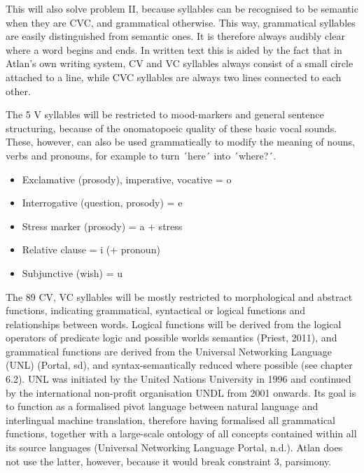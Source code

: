 This will also solve problem II, because syllables can be recognised to be semantic when they are CVC, and grammatical otherwise. This way, grammatical syllables are easily distinguished from semantic ones. It is therefore always audibly clear where a word begins and ends. In written text this is aided by the fact that in Atlan’s own writing system, CV and VC syllables always consist of a small circle attached to a line, while CVC syllables are always two lines connected to each other.  

The 5 V syllables will be restricted to mood-markers and general sentence structuring, because of the onomatopoeic quality of these basic vocal sounds. These, however, can also be used grammatically to modify the meaning of nouns, verbs and pronouns, for example to turn ´here´ into ´where?´.  
\begin{itemize}
\item    Exclamative (prosody), imperative, vocative = o  \Atlano

\item    Interrogative (question, prosody) = e  \Atlane

\item    Stress marker (prosody) = a + stress \Atlana

\item    Relative clause = i (+ pronoun) \Atlani

\item    Subjunctive (wish) = u \Atlanu
\end{itemize}

 

The 89 CV, VC syllables will be mostly restricted to morphological and abstract functions, indicating grammatical, syntactical or logical functions and relationships between words. Logical functions will be derived from the logical operators of predicate logic and possible worlds semantics (Priest, 2011), and grammatical functions are derived from the Universal Networking Language (UNL) (Portal, sd), and syntax-semantically reduced where possible (see chapter 6.2). UNL was initiated by the United Nations University in 1996 and continued by the international non-profit organisation UNDL from 2001 onwards. Its goal is to function as a formalised pivot language between natural language and interlingual machine translation, therefore having formalised all grammatical functions, together with a large-scale ontology of all concepts contained within all its source languages (Universal Networking Language Portal, n.d.). Atlan does not use the latter, however, because it would break constraint 3, parsimony. 	

